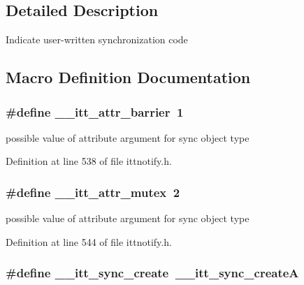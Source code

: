 \subsection{Detailed Description}
Indicate user-\/written synchronization code 

\subsection{Macro Definition Documentation}
\hypertarget{group__sync_gaa2de2b08cecad1d567b5312c503ad217}{
\subsubsection[{\-\_\-\-\_\-itt\-\_\-attr\-\_\-barrier}]{\setlength{\rightskip}{0pt plus 5cm}\#define \-\_\-\-\_\-itt\-\_\-attr\-\_\-barrier~1}}\label{group__sync_gaa2de2b08cecad1d567b5312c503ad217}


possible value of attribute argument for sync object type 



Definition at line 538 of file ittnotify.\-h.

\hypertarget{group__sync_ga8c78a4fc23e9e2ed0f3d19cd92c7a60d}{
\subsubsection[{\-\_\-\-\_\-itt\-\_\-attr\-\_\-mutex}]{\setlength{\rightskip}{0pt plus 5cm}\#define \-\_\-\-\_\-itt\-\_\-attr\-\_\-mutex~2}}\label{group__sync_ga8c78a4fc23e9e2ed0f3d19cd92c7a60d}


possible value of attribute argument for sync object type 



Definition at line 544 of file ittnotify.\-h.

\hypertarget{group__sync_gaa7e7aa1f544a4a08faee32b776d534b1}{
\subsubsection[{\-\_\-\-\_\-itt\-\_\-sync\-\_\-create}]{\setlength{\rightskip}{0pt plus 5cm}\#define \-\_\-\-\_\-itt\-\_\-sync\-\_\-create~{\bf \-\_\-\-\_\-itt\-\_\-sync\-\_\-create\-A}}}\label{group__sync_gaa7e7aa1f544a4a08faee32b776d534b1}


